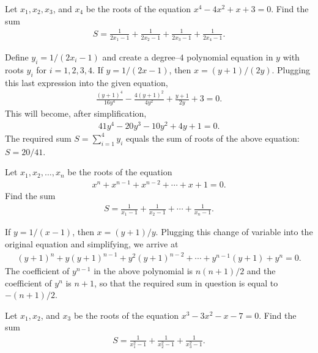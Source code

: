\documentclass[12pt,a4paper]{memoir}
\theoremstyle{definition}
\begin{document}
\begin{question}
	Let $x_1,x_2,x_3$, and $x_4$ be the roots of the equation $x^4-4x^2+x+3=0$. Find the sum
	\begin{align*}
		S = \frac{1}{2x_1-1}+\frac{1}{2x_2-1}+\frac{1}{2x_3-1}+\frac{1}{2x_4-1}.
	\end{align*}
\end{question}

\begin{solution}
	Define $y_i=1/(2x_i-1)$ and create a degree--$4$ polynomial equation in $y$ with roots $y_i$ for $i=1,2,3,4$. If $y=1/(2x-1)$, then $x=(y+1)/(2y)$. Plugging this last expression into the given equation,
	\begin{align*}
		\frac{(y+1)^4}{16y^4}-\frac{4(y+1)^2}{4y^2} + \frac{y+1}{2y} + 3 = 0.
	\end{align*}
	This will become, after simplification, 
	\begin{align*}
		41y^4-20y^3-10y^2+4y+1=0.
	\end{align*}
	The required sum $S=\sum_{i=1}^4 y_i$ equals the sum of roots of the above equation: $S=20/41$.
\end{solution}



\begin{question}
	Let $x_1,x_2,\dots,x_n$ be the roots of the equation
	\begin{align*}
		x^n + x^{n-1} + x^{n-2} + \cdots + x + 1 =0.
	\end{align*}
	Find the sum
	\begin{align*}
		S = \frac{1}{x_1-1}+\frac{1}{x_2-1}+\cdots + \frac{1}{x_n-1}.
	\end{align*}
\end{question}

\begin{solution}
	If $y=1/(x-1)$, then $x=(y+1)/y$. Plugging this change of variable into the original equation and simplifying, we arrive at
	\begin{align*}
		(y+1)^n + y(y+1)^{n-1} + y^2(y+1)^{n-2} + \cdots + y^{n-1}(y+1)+y^n=0.
	\end{align*}
	The coefficient of $y^{n-1}$ in the above polynomial is $n(n+1)/2$ and the coefficient of $y^n$ is $n+1$, so that the required sum in question is equal to $-(n+1)/2$.
\end{solution}



\begin{question}
	Let $x_1,x_2$, and $x_3$ be the roots of the equation $x^3-3x^2-x-7=0$. Find the sum
	\begin{align*}
		S = \frac{1}{x_1^2-1}+\frac{1}{x_2^2-1}+\frac{1}{x_3^2-1}.
	\end{align*}
\end{question}
\end{document}
